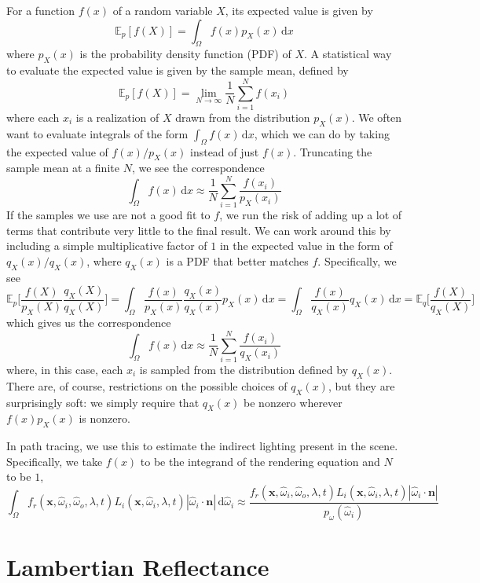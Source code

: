 \documentclass{article}
\begin{document}
For a function $f(x)$ of a random variable $X$, its expected value is given by
\[
	\mathbb{E}_p[f(X)] = \int_{\Omega}f(x)p_X(x)\,\mathrm{d}x
\]
where $p_X(x)$ is the probability density function (PDF) of $X$. A statistical way to evaluate the expected value is given by the sample mean, defined by
\[
	\mathbb{E}_p[f(X)] = \lim_{N\to\infty}\frac{1}{N}\sum_{i=1}^Nf(x_i)
\]
where each $x_i$ is a realization of $X$ drawn from the distribution $p_X(x)$. We often want to evaluate integrals of the form $\int_\Omega f(x)\,\mathrm{d}x$, which we can do by taking the expected value of $f(x)/p_X(x)$ instead of just $f(x)$. Truncating the sample mean at a finite $N$, we see the correspondence
\[
	\int_\Omega f(x)\,\mathrm{d}x \approx \frac{1}{N}\sum_{i=1}^N\frac{f(x_i)}{p_X(x_i)}
\]
If the samples we use are not a good fit to $f$, we run the risk of adding up a lot of terms that contribute very little to the final result. We can work around this by including a simple multiplicative factor of $1$ in the expected value in the form of $q_X(x)/q_X(x)$, where $q_X(x)$ is a PDF that better matches $f$. Specifically, we see
\[
	\mathbb{E}_p\Big[\frac{f(X)}{p_X(X)}\frac{q_X(X)}{q_X(X)}\Big] = \int_\Omega \frac{f(x)}{p_X(x)}\frac{q_X(x)}{q_X(x)}p_X(x)\,\mathrm{d}x = \int_\Omega \frac{f(x)}{q_X(x)}q_X(x)\,\mathrm{d}x = \mathbb{E}_q\Big[\frac{f(X)}{q_X(X)}\Big]
\]
which gives us the correspondence
\[
\int_\Omega f(x)\,\mathrm{d}x \approx \frac{1}{N}\sum_{i=1}^N\frac{f(x_i)}{q_X(x_i)}
\]
where, in this case, each $x_i$ is sampled from the distribution defined by $q_X(x)$. There are, of course, restrictions on the possible choices of $q_X(x)$, but they are surprisingly soft: we simply require that $q_X(x)$ be nonzero wherever $f(x)p_X(x)$ is nonzero.

In path tracing, we use this to estimate the indirect lighting present in the scene. Specifically, we take $f(x)$ to be the integrand of the rendering equation and $N$ to be $1$,
\[
	\int_\Omega f_r(\mathbf{x}, \hat{\omega}_i, \hat{\omega}_o, \lambda, t)L_i(\mathbf{x}, \hat{\omega}_i, \lambda, t)|\hat{\omega}_i\cdot\mathbf{n}|\,\mathrm{d}\hat{\omega}_i \approx \frac{f_r(\mathbf{x}, \hat{\omega}_i, \hat{\omega}_o, \lambda, t)L_i(\mathbf{x}, \hat{\omega}_i, \lambda, t)|\hat{\omega}_i\cdot\mathbf{n}|}{p_\omega(\hat{\omega}_i)}
\]

\section*{Lambertian Reflectance}
\end{document}
